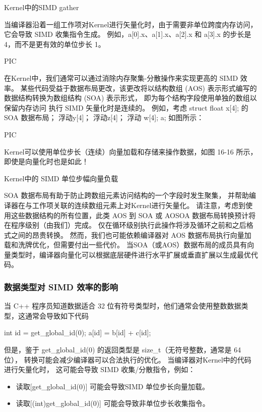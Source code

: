 {\color{red} Kernel中的SIMD gather}

当编译器沿着一组工作项对Kernel进行矢量化时，由于需要非单位跨度内存访问，它会导致 SIMD 收集指令生成。 
例如，a[0].x、a[1].x、a[2].x 和 a[3].x 的步长是 4，而不是更有效的单位步长 1。

{\color{blue} PIC}

在Kernel中，我们通常可以通过消除内存聚集-分散操作来实现更高的 SIMD 效率。 
某些代码受益于数据布局更改，该更改将以结构数组 (AOS) 表示形式编写的数据结构转换为数组结构 (SOA) 表示形式，
即为每个结构字段使用单独的数组以保留内存访问 执行 SIMD 矢量化时是连续的。 
例如，考虑 struct {float x[4]; 的 SOA 数据布局； 浮动y[4]； 浮动z[4]； 浮动 w[4];} a; 如图所示：

{\color{blue} PIC}

Kernel可以使用单位步长（连续）向量加载和存储来操作数据，如图 16-16 所示，即使是向量化时也是如此！

{\color{red} Kernel中的 SIMD 单位步幅向量负载}

SOA 数据布局有助于防止跨数组元素访问结构的一个字段时发生聚集，
并帮助编译器在与工作项关联的连续数组元素上对Kernel进行矢量化。 
请注意，考虑到使用这些数据结构的所有位置，此类 AOS 到 SOA 或 AOSOA 数据布局转换预计将在程序级别（由我们）完成。 
仅在循环级别执行此操作将涉及循环之前和之后格式之间的昂贵转换。 
然而，我们也可能依赖编译器对 AOS 数据布局执行向量加载和洗牌优化，但需要付出一些代价。 
当SOA（或AOS）数据布局的成员具有向量类型时，编译器向量化可以根据底层硬件进行水平扩展或垂直扩展以生成最优代码。

\subsubsection{数据类型对 SIMD 效率的影响}
当 C++ 程序员知道数据适合 32 位有符号类型时，他们通常会使用整数数据类型，这通常会导致如下代码

int id = get\_global\_id(0); a[id] = b[id] + c[id];

但是，鉴于 get\_global\_id(0) 的返回类型是 size\_t（无符号整数，通常是 64 位），
转换可能会减少编译器可以合法执行的优化。 当编译器对Kernel中的代码进行矢量化时，
这可能会导致 SIMD 收集/分散指令，例如：

\begin{itemize}
	\item 读取[get\_global\_id(0)] 可能会导致SIMD 单位步长向量加载。

	\item 读取[(int)get\_global\_id(0)] 可能会导致非单位步长收集指令。
\end{itemize}

